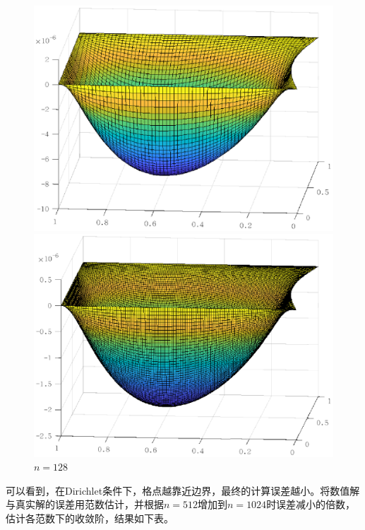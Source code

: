 \documentclass[lang=cn,10pt]{elegantbook}
\begin{document}
\begin{figure}[H]
\begin{minipage}[t]{0.24\linewidth}
    \caption*{$n=32$}
  \end{minipage}
  \begin{minipage}[t]{0.24\linewidth}
    \centering
    \includegraphics[width=0.95\linewidth]{figure/3-1-3.eps}
    \caption*{$n=64$}
  \end{minipage}
  \begin{minipage}[t]{0.24\linewidth}
    \centering
    \includegraphics[width=0.95\linewidth]{figure/3-1-4.eps}
    \caption*{$n=128$}
  \end{minipage}
\end{figure}

可以看到，在Dirichlet条件下，格点越靠近边界，最终的计算误差越小。将数值解与真实解的误差用范数估计，并根据$n=512$增加到$n=1024$时误差减小的倍数，估计各范数下的收敛阶，结果如下表。
\end{document}
